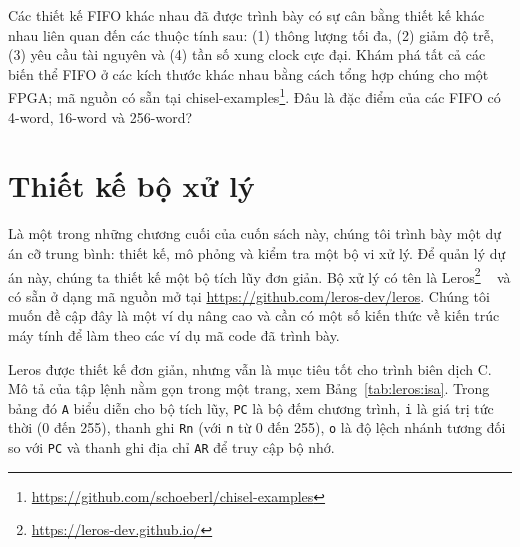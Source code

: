 \documentclass[%
    10pt,
    headinclude, footexclude,
    openright, %
    notitlepage,
    cleardoubleempty,
    headsepline,
    pointlessnumbers,
    bibtotoc, idxtotoc,
    ]{scrbook}
\newcommand{\code}[1]{{\small{\texttt{#1}}}}
\newcommand{\myref}[2]{\href{#1}{#2}}
\renewcommand{\myref}[2]{{#2}{\footnote{\url{#1}}}}
\begin{document}
Các thiết kế FIFO khác nhau đã được trình bày có sự cân bằng thiết kế khác nhau liên quan đến các thuộc tính sau: (1) thông lượng tối đa, (2) giảm độ trễ, (3) yêu cầu tài nguyên và (4) tần số xung clock cực đại. Khám phá tất cả các biến thể FIFO ở các kích thước khác nhau bằng cách tổng hợp chúng cho một FPGA; mã nguồn có sẵn tại \myref{https://github.com/schoeberl/chisel-examples}{chisel-examples}.
Đâu là đặc điểm của các FIFO có 4-word, 16-word và 256-word? 

\chapter{Thiết kế bộ xử lý}


Là một trong những chương cuối của cuốn sách này, chúng tôi trình bày một dự án cỡ trung bình: thiết kế, mô phỏng và kiểm tra một bộ vi xử lý. Để quản lý dự án này, chúng ta thiết kế một bộ tích lũy đơn giản. Bộ xử lý có tên là \myref{https://leros-dev.github.io/}{Leros} ~\cite{leros:arcs2019} và có sẵn ở dạng mã nguồn mở tại \url{https://github.com/leros-dev/leros}. Chúng tôi muốn đề cập đây là một ví dụ nâng cao và cần có một số kiến thức về kiến trúc máy tính  để làm theo các ví dụ mã code đã trình bày. 

Leros được thiết kế đơn giản, nhưng vẫn là mục tiêu tốt cho trình biên dịch C. Mô tả của tập lệnh nằm gọn trong một trang, xem Bảng~\ref{tab:leros:isa}. Trong bảng đó \code{A} biểu diễn cho bộ tích lũy, \code{PC} là bộ đếm chương trình, \code{i} là giá trị tức thời (0 đến 255), thanh ghi \code{Rn} (với \code{n} từ 0 đến 255), \code{o} là độ lệch nhánh tương đối so với \code{PC} và thanh ghi địa chỉ \code{AR} để truy cập bộ nhớ. 
\end{document}
